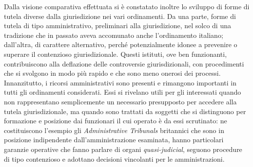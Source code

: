\documentclass[12pt,it,a4paper,]{report}
\begin{document}
Dalla visione comparativa effettuata si è constatato inoltre lo sviluppo
di forme di tutela diverse dalla giurisdizione nei vari ordinamenti. Da
una parte, forme di tutela di tipo amministrativo, preliminari alla
giurisdizione, nel solco di una tradizione che in passato aveva
accomunato anche l'ordinamento italiano; dall'altra, di carattere
alternativo, perché potenzialmente idonee a prevenire o superare il
contenzioso giurisdizionale. Questi istituti, ove ben funzionanti,
contribuiscono alla deflazione delle controversie giurisdizionali, con
procedimenti che si svolgono in modo più rapido e che sono meno onerosi
dei processi. Innanzitutto, i ricorsi amministrativi sono presenti e
rimangono importanti in tutti gli ordinamenti considerati. Essi si
rivelano utili per gli interessati quando non rappresentano
semplicemente un necessario presupposto per accedere alla tutela
giurisdizionale, ma quando sono trattati da soggetti che si distinguono
per formazione e posizione dai funzionari il cui operato è da essi
scrutinato: ne costituiscono l'esempio gli \emph{Administrative
Tribunals} britannici che sono in posizione indipendente
dall'amministrazione esaminata, hanno particolari garanzie operative che
fanno parlare di organi \emph{quasi-judicial}, seguono procedure di tipo
contenzioso e adottano decisioni vincolanti per le amministrazioni.
\end{document}
